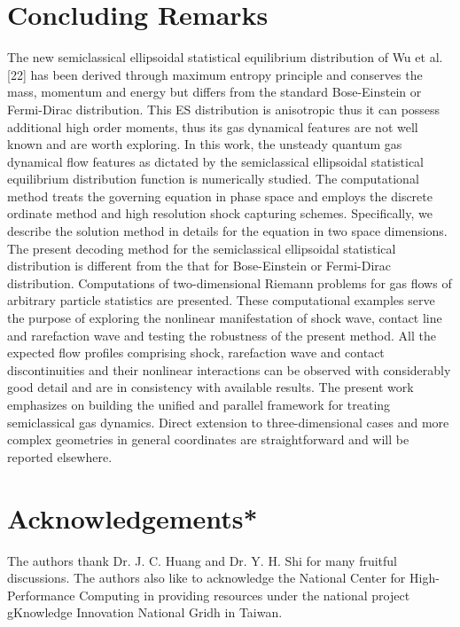 \documentclass{rsproca}%
\begin{document}
\section{Concluding Remarks}
\label{remarks}
The new semiclassical ellipsoidal statistical equilibrium distribution of Wu et al. [22] has been derived through maximum entropy principle and conserves the mass, momentum and energy but differs from the standard Bose-Einstein or Fermi-Dirac distribution.  This ES distribution is anisotropic thus it can possess additional high order moments, thus its gas dynamical features are not well known and are worth exploring.   In this work, the unsteady quantum gas dynamical flow features as dictated by the semiclassical ellipsoidal statistical equilibrium distribution function is numerically studied.   The computational method treats the governing equation in phase space and employs the discrete ordinate method and high resolution shock capturing schemes.  Specifically, we describe the solution method in details for the equation in two space dimensions.   The present decoding method for the semiclassical ellipsoidal statistical distribution is different from the that for Bose-Einstein or Fermi-Dirac distribution.   Computations of two-dimensional Riemann problems for gas flows of arbitrary particle statistics are presented.  These computational examples serve the purpose of exploring the nonlinear manifestation of shock wave, contact line and rarefaction wave and testing the robustness of the present method.   All the expected flow profiles comprising shock, rarefaction wave and contact discontinuities and their nonlinear interactions can be observed with considerably good detail and are in consistency with available results.   The present work emphasizes on building the unified and parallel framework for treating semiclassical gas dynamics.   Direct extension to three-dimensional cases and more complex geometries in general coordinates are straightforward and will be reported elsewhere.


\section{Acknowledgements*}
\label{Acknowledgements}
The authors thank Dr. J. C. Huang and Dr. Y. H. Shi for many fruitful discussions. The authors also like to acknowledge the National
Center for High-Performance Computing in providing resources
under the national project gKnowledge Innovation National Gridh in Taiwan.
\end{document}
